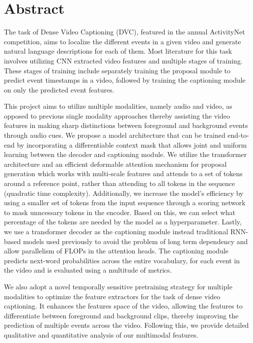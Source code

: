 \documentclass[]{book}
\begin{document}
\chapter*{Abstract}
\par The task of Dense Video Captioning (DVC), featured in the annual ActivityNet competition, aims to localize the different events in a given video and generate natural language descriptions for each of them. Most literature for this task involves utilizing CNN extracted video features and multiple stages of training. These stages of training include separately training the proposal module to predict event timestamps in a video, followed by training the captioning module on only the predicted event features.
\par This project aims to utilize multiple modalities, namely audio and video, as opposed to previous single modality approaches thereby assisting the video features in making sharp distinctions between foreground and background events through audio cues. We propose a model architecture that can be trained end-to-end by incorporating a differentiable context mask that allows joint and uniform learning between the decoder and captioning module. We utilize the transformer architecture and an efficient deformable attention mechanism for proposal generation which works with multi-scale features and attends to a set of tokens around a reference point, rather than attending to all tokens in the sequence (quadratic time complexity). Additionally, we increase the model's efficiency by using a smaller set of tokens from the input sequence through a scoring network to mask unncessary tokens in the encoder. Based on this, we can select what percentage of the tokens are needed by the model as a hyperparameter. Lastly, we use a transformer decoder as the captioning module instead traditional RNN-based models used previously to avoid the problem of long term dependency and allow parallelism of FLOPs in the attention heads. The captioning module predicts next-word probabilities across the entire vocabulary, for each event in the video and is evaluated using a multitude of metrics.
\par We also adopt a novel temporally sensitive pretraining strategy for multiple modalities to optimize the feature extractors for the task of dense video captioning. It enhances the features space of the video, allowing the features to differentiate between foreground and background clips, thereby improving the prediction of multiple events across the video. Following this, we provide detailed qualitative and quantitative analysis of our multimodal features.
\end{document}
